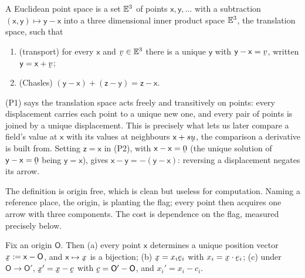 \begin{definition}\label{def:eps}
A Euclidean point space is a set $\mathbb{E}^{3}$ of points
$\mathsf{x},\mathsf{y},\dots$ with a subtraction
$(\mathsf{x},\mathsf{y})\mapsto\mathsf{y}-\mathsf{x}$ into a three
dimensional inner product space $\mathbb{E}^{3}$, the translation space, such that
\begin{enumerate}[label=\textup{(P\arabic*)},leftmargin=2.6em]
\item \textup{(transport)} for every $\mathsf{x}$ and $\bv\in\Et$ there is
      a unique $\mathsf{y}$ with $\mathsf{y}-\mathsf{x}=\bv$, written
      $\mathsf{y}=\mathsf{x}+\bv$;
\item \textup{(Chasles)} $(\mathsf{y}-\mathsf{x})+(\mathsf{z}-\mathsf{y})
      =\mathsf{z}-\mathsf{x}$.
\end{enumerate}
\end{definition}

\begin{remark}\label{rem:axioms}
(P1) says the translation space acts freely and transitively on points:
every displacement carries each point to a unique new one, and every pair
of points is joined by a unique displacement. This is precisely what lets
us later compare a field's value at $\mathsf{x}$ with its values at
neighbours $\mathsf{x}+s\bu$, the comparison a derivative is built from.
Setting $\mathsf{z}=\mathsf{x}$ in (P2), with $\mathsf{x}-\mathsf{x}=\bze$
(the unique solution of $\mathsf{y}-\mathsf{x}=\bze$ being
$\mathsf{y}=\mathsf{x}$), gives $\mathsf{x}-\mathsf{y}
=-(\mathsf{y}-\mathsf{x})$: reversing a displacement negates its arrow.
\end{remark}

The definition is origin free, which is clean but useless for computation.
Naming a reference place, the origin, is planting the flag; every point
then acquires one arrow with three components. The cost is dependence on
the flag, measured precisely below.

\begin{proposition}\label{prop:posvec}
Fix an origin $\mathsf{O}$. Then (a) every point $\mathsf{x}$ determines a
unique position vector $\bx:=\mathsf{x}-\mathsf{O}$, and
$\mathsf{x}\mapsto\bx$ is a bijection; (b) $\bx=x_i\be_i$ with
$x_i=\ip\bx{\be_i}$; (c) under $\mathsf{O}\to\mathsf{O}'$,
$\bx'=\bx-\bc$ with $\bc=\mathsf{O}'-\mathsf{O}$, and $x_i'=x_i-c_i$.
\end{proposition}

